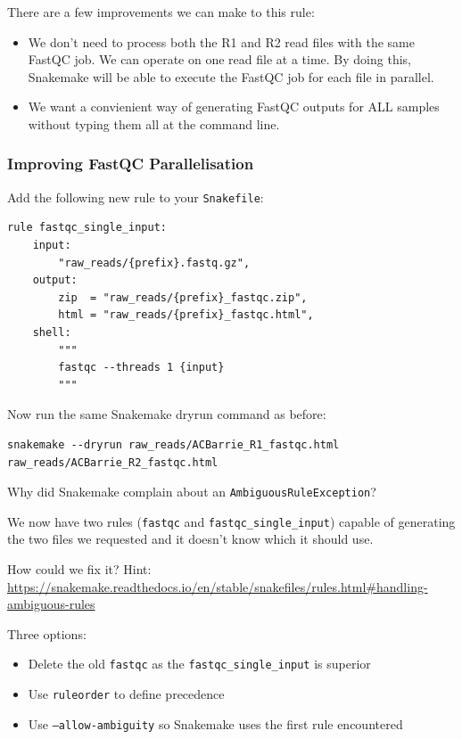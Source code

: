 There are a few improvements we can make to this rule:

\begin{itemize}
  \item We don't need to process both the R1 and R2 read files with the same FastQC job. We can operate on one read file at a time.
        By doing this, Snakemake will be able to execute the FastQC job for each file in parallel.
  \item We want a convienient way of generating FastQC outputs for ALL samples without typing them all at the command line.
\end{itemize}

\subsubsection{Improving FastQC Parallelisation}

Add the following new rule to your \texttt{Snakefile}:

\begin{lstlisting}
rule fastqc_single_input:
	input:
		"raw_reads/{prefix}.fastq.gz",
	output:
		zip  = "raw_reads/{prefix}_fastqc.zip",
		html = "raw_reads/{prefix}_fastqc.html",
	shell:
		"""
		fastqc --threads 1 {input}
		"""
\end{lstlisting}

Now run the same Snakemake dryrun command as before:

\begin{lstlisting}
snakemake --dryrun raw_reads/ACBarrie_R1_fastqc.html raw_reads/ACBarrie_R2_fastqc.html
\end{lstlisting}

\begin{questions}

Why did Snakemake complain about an \texttt{AmbiguousRuleException}?

\begin{answer}

We now have two rules (\texttt{fastqc} and \texttt{fastqc\_single\_input}) capable of generating the two files we
requested and it doesn't know which it should use.

\end{answer}

How could we fix it? Hint: \url{https://snakemake.readthedocs.io/en/stable/snakefiles/rules.html#handling-ambiguous-rules}

\begin{answer}

Three options:

\begin{itemize}
  \item Delete the old \texttt{fastqc} as the \texttt{fastqc\_single\_input} is superior
  \item Use \texttt{ruleorder} to define precedence
  \item Use \texttt{--allow-ambiguity} so Snakemake uses the first rule encountered
\end{itemize}

\end{answer}

\end{questions}


